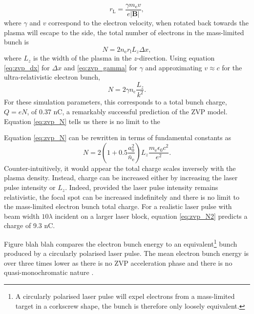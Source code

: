\begin{equation}
	r_\mathrm{L} = \frac{\gamma m_\mathrm{e}v}{e|\mathbf{B}|},
\end{equation}
where $\gamma$ and $v$ correspond to the electron velocity, when rotated back towards the plasma will escape to the side, the total number of electrons in the mass-limited bunch is
\begin{equation}
	N = 2 n_\mathrm{e} r_\mathrm{l} L_z \Delta x,
\end{equation}
where $L_z$ is the width of the plasma in the $z$-direction. Using equation \ref{eq:zvp_dx} for $\Delta x$ and \ref{eq:zvp_gamma} for $\gamma$ and approximating $v \approx c$ for the ultra-relativistic electron bunch, 
\begin{equation}\label{eq:zvp_N}
	N = 2 \gamma n_\mathrm{c} \frac{L_z}{k^2}.
\end{equation}
For these simulation parameters, this corresponds to a total bunch charge, $Q = eN$, of 0.37 nC, a remarkably successful prediction of the ZVP model. Equation \ref{eq:zvp_N} tells us there is no limit to the 

Equation \ref{eq:zvp_N} can be rewritten in terms of fundamental constants as
\begin{equation}\label{eq:zvp_N2}
	N = 2 (1+0.5\frac{a^2_0}{\bar{n}_\mathrm{e}}) L_z \frac{m_\mathrm{e}\epsilon_0c^2}{e^2}.
\end{equation}
Counter-intuitively, it would appear the total charge scales inversely with the plasma density. Instead, charge can be increased either by increasing the laser pulse intensity or $L_z$. Indeed, provided the laser pulse intensity remains relativistic, the focal spot can be increased indefinitely and there is no limit to the mass-limited electron bunch total charge. For a realistic laser pulse with beam width $10 \lambda$ incident on a larger laser block, equation \ref{eq:zvp_N2} predicts a charge of 9.3 nC.

Figure blah blah compares the electron bunch energy to an equivalent\footnote{A circularly polarised laser pulse will expel electrons from a mass-limited target in a corkscrew shape, the bunch is therefore only loosely equivalent.} bunch produced by a circularly polarised laser pulse. The mean electron bunch energy is over three times lower as there is no ZVP acceleration phase and there is no quasi-monochromatic nature \cite{baevaZeroVectorPotential2011}. 


